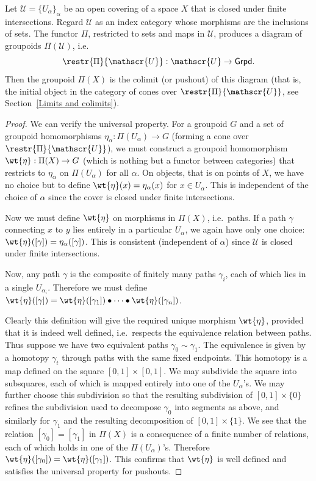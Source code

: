 \begin{thm}
    Let $\mathscr{U}=\{U_\alpha\}_\alpha$ be an open covering of a space $X$ that is closed under finite intersections. Regard $\mathscr{U}$ as an index category whose morphisms are the inclusions of sets. The functor $\Pi$, restricted to sets and maps in $\mathscr{U}$, produces a diagram of groupoids $\Pi(\mathscr{U})$, i.e.
    \[\restr{\Pi}{\mathscr{U}}: \mathscr{U}\to \mathsf{Grpd}.\]
    Then the groupoid $\Pi(X)$ is the colimit (or pushout) of this diagram (that is, the initial object in the category of cones over $\restr{\Pi}{\mathscr{U}}$, see Section~\ref{Limits and colimits}).
\end{thm}
\begin{proof}
    We can verify the universal property. For a groupoid $G$ and a set of groupoid homomorphisms $\eta_\alpha:\Pi(U_\alpha)\to G$ (forming a cone over $\restr{\Pi}{\mathscr{U}}$), we must construct a groupoid homomorphism $\wt{\eta}:\Pi(X)\to G$ (which is nothing but a functor between categories) that restricts to $\eta_\alpha$ on $\Pi(U_\alpha)$ for all $\alpha$. On objects, that is on points of $X$, we have no choice but to define $\wt{\eta}(x)=\eta_\alpha(x)$ for $x\in U_\alpha$. This is independent of the choice of $\alpha$ since the cover is closed under finite intersections.

    Now we must define $\wt{\eta}$ on morphisms in $\Pi(X)$, i.e.\ paths. If a path $\gamma$ connecting $x$ to $y$ lies entirely in a particular $U_\alpha$, we again have only one choice: $\wt{\eta}([\gamma])=\eta_\alpha([\gamma])$. This is consistent (independent of $\alpha$) since $\mathscr{U}$ is closed under finite intersections.

    Now, any path $\gamma$ is the composite of finitely many paths $\gamma_i$, each of which lies in a single $U_{\alpha_i}$. Therefore we must define $\wt{\eta}([\gamma])=\wt{\eta}([\gamma_1])\bullet \cdots \bullet \wt{\eta}([\gamma_n])$. 
    
    Clearly this definition will give the required unique morphism $\wt{\eta}$, provided that it is indeed well defined, i.e.\ respects the equivalence relation between paths. Thus suppose we have two equivalent paths $\gamma_0\sim \gamma_1$. The equivalence is given by a homotopy $\gamma_t$ through paths with the same fixed endpoints. This homotopy is a map defined on the square $[0,1]\times[0,1]$. We may subdivide the square into subsquares, each of which is mapped entirely into one of the $U_\alpha$'s. We may further choose this subdivision so that the resulting subdivision of $[0,1]\times\{0\}$ refines the subdivision used to decompose $\gamma_0$ into segments as above, and similarly for $\gamma_1$ and the resulting decomposition of $[0,1]\times \{1\}$. We see that the relation $[\gamma_0]=[\gamma_1]$ in $\Pi(X)$ is a consequence of a finite number of relations, each of which holds in one of the $\Pi(U_\alpha)$'s. Therefore $\wt{\eta}([\gamma_0])=\wt{\eta}([\gamma_1])$. This confirms that $\wt{\eta}$ is well defined and satisfies the universal property for pushouts.    
\end{proof}
